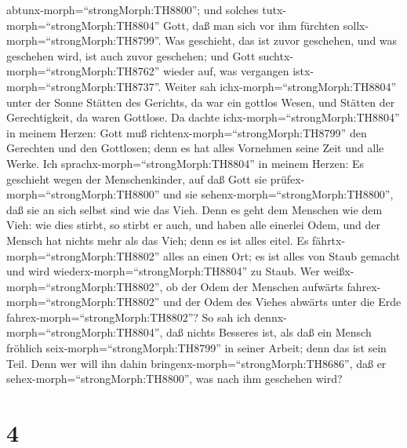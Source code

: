 abtunx-morph=``strongMorph:TH8800''; und solches
tutx-morph=``strongMorph:TH8804'' Gott, daß man sich vor ihm fürchten
sollx-morph=``strongMorph:TH8799''.  Was geschieht, das ist
zuvor geschehen, und was geschehen wird, ist auch zuvor geschehen; und
Gott suchtx-morph=``strongMorph:TH8762'' wieder auf, was vergangen
istx-morph=``strongMorph:TH8737''.  Weiter sah
ichx-morph=``strongMorph:TH8804'' unter der Sonne Stätten des Gerichts,
da war ein gottlos Wesen, und Stätten der Gerechtigkeit, da waren
Gottlose.  Da dachte ichx-morph=``strongMorph:TH8804'' in
meinem Herzen: Gott muß richtenx-morph=``strongMorph:TH8799'' den
Gerechten und den Gottlosen; denn es hat alles Vornehmen seine Zeit und
alle Werke.  Ich sprachx-morph=``strongMorph:TH8804'' in
meinem Herzen: Es geschieht wegen der Menschenkinder, auf daß Gott sie
prüfex-morph=``strongMorph:TH8800'' und sie
sehenx-morph=``strongMorph:TH8800'', daß sie an sich selbst sind wie das
Vieh.  Denn es geht dem Menschen wie dem Vieh: wie dies
stirbt, so stirbt er auch, und haben alle einerlei Odem, und der Mensch
hat nichts mehr als das Vieh; denn es ist alles eitel.  Es
fährtx-morph=``strongMorph:TH8802'' alles an einen Ort; es ist alles von
Staub gemacht und wird wiederx-morph=``strongMorph:TH8804'' zu Staub.
 Wer weißx-morph=``strongMorph:TH8802'', ob der Odem der
Menschen aufwärts fahrex-morph=``strongMorph:TH8802'' und der Odem des
Viehes abwärts unter die Erde fahrex-morph=``strongMorph:TH8802''?
 So sah ich dennx-morph=``strongMorph:TH8804'', daß nichts
Besseres ist, als daß ein Mensch fröhlich
seix-morph=``strongMorph:TH8799'' in seiner Arbeit; denn das ist sein
Teil. Denn wer will ihn dahin bringenx-morph=``strongMorph:TH8686'', daß
er sehex-morph=``strongMorph:TH8800'', was nach ihm geschehen wird?

\hypertarget{section-3}{%
\section{4}\label{section-3}}

